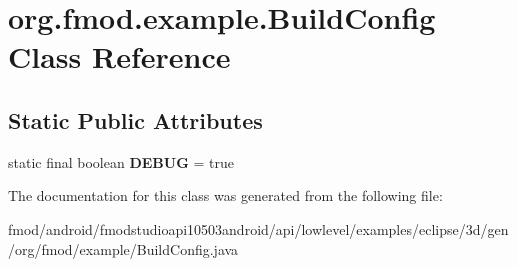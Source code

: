 \hypertarget{classorg_1_1fmod_1_1example_1_1_build_config}{\section{org.\+fmod.\+example.\+Build\+Config Class Reference}
\label{classorg_1_1fmod_1_1example_1_1_build_config}
}
\subsection*{Static Public Attributes}
\begin{DoxyCompactItemize}
\item 
\hypertarget{classorg_1_1fmod_1_1example_1_1_build_config_aa6717ebd5829e6eb28c889df75f89c17}{static final boolean {\bfseries D\+E\+B\+U\+G} = true}\label{classorg_1_1fmod_1_1example_1_1_build_config_aa6717ebd5829e6eb28c889df75f89c17}

\end{DoxyCompactItemize}


The documentation for this class was generated from the following file\+:\begin{DoxyCompactItemize}
\item 
fmod/android/fmodstudioapi10503android/api/lowlevel/examples/eclipse/3d/gen/org/fmod/example/Build\+Config.\+java\end{DoxyCompactItemize}

